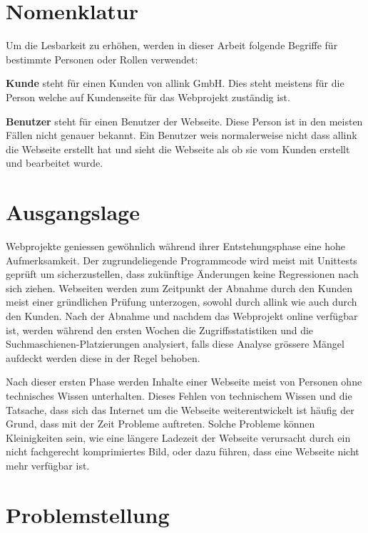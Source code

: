 
\section{Nomenklatur}
\label{sec:nomenklatur}

Um die Lesbarkeit zu erhöhen, werden in dieser Arbeit folgende Begriffe für bestimmte Personen oder Rollen verwendet:

{\bf Kunde} steht für einen Kunden von allink GmbH. Dies steht meistens für die Person welche auf Kundenseite für das Webprojekt zuständig ist.

{\bf Benutzer} steht für einen Benutzer der Webseite. Diese Person ist in den meisten Fällen nicht genauer bekannt. Ein Benutzer weis normalerweise nicht dass allink die Webseite erstellt hat und sieht die Webseite als ob sie vom Kunden erstellt und bearbeitet wurde.

\section{Ausgangslage}
\label{sec:ausgangslage}

Webprojekte geniessen gewöhnlich während ihrer Entstehungsphase eine hohe Aufmerksamkeit. Der zugrundeliegende Programmcode wird meist mit Unittests geprüft um sicherzustellen, dass zukünftige Änderungen keine Regressionen nach sich ziehen. Webseiten werden zum Zeitpunkt der Abnahme durch den Kunden meist einer gründlichen Prüfung unterzogen, sowohl durch allink wie auch durch den Kunden. Nach der Abnahme und nachdem das Webprojekt online verfügbar ist, werden während den ersten Wochen die Zugriffsstatistiken und die Suchmaschienen-Platzierungen analysiert, falls diese Analyse grössere Mängel aufdeckt werden diese in der Regel behoben.

Nach dieser ersten Phase werden Inhalte einer Webseite meist von Personen ohne technisches Wissen unterhalten. Dieses Fehlen von technischem Wissen und die Tatsache, dass sich das Internet um die Webseite weiterentwickelt ist häufig der Grund, dass mit der Zeit Probleme auftreten. Solche Probleme können Kleinigkeiten sein, wie eine längere Ladezeit der Webseite verursacht durch ein nicht fachgerecht komprimiertes Bild, oder dazu führen, dass eine Webseite nicht mehr verfügbar ist.

\section{Problemstellung}
\label{sec:problemstellung}

